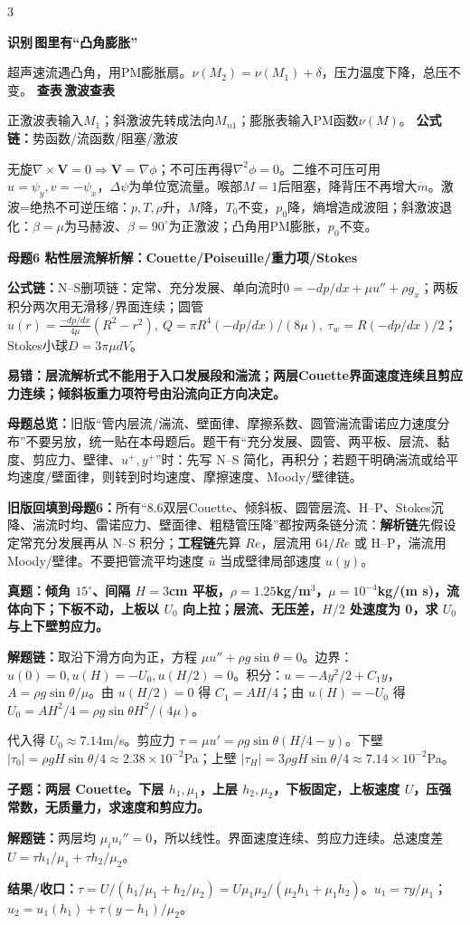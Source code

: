 \documentclass[a4paper]{article}
\newcommand{\mt}[1]{\vspace{0.12pt}\colorbox{M}{\parbox{\dimexpr\linewidth-2\fboxsep}{\color{white}\bfseries #1}}\par}
\newcommand{\qt}[1]{\vspace{0.04pt}\colorbox{Q}{\parbox{\dimexpr\linewidth-2\fboxsep}{\color{white}\bfseries #1}}\par}
\newcommand{\ans}[1]{\colorbox{G}{\parbox{\dimexpr\linewidth-2\fboxsep}{#1}}\par}
\newcommand{\warn}[1]{\colorbox{Y}{\parbox{\dimexpr\linewidth-2\fboxsep}{\color{E}\bfseries #1}}\par}
\newcommand{\chain}[1]{{\color{A}\bfseries 解题链：}#1\par}
\newcommand{\res}[1]{{\color{E}\bfseries 结果/收口：}#1\par}
\newcommand{\form}[1]{{\color{M}\bfseries 公式链：}#1\par}
\newcommand{\labtag}[3]{{\bfseries\color{#1}\colorbox{#1}{\color{white}\fontsize{2.18}{2.28}\selectfont #2}\,#3}\par}
\newcommand{\iden}[1]{\labtag{C}{识别}{#1}}
\newcommand{\lookup}[1]{\labtag{C}{查表}{#1}}
\newcommand{\mview}[1]{\ans{\textbf{母题总览：}#1}}
\newcommand{\idq}[1]{\iden{#1}}
\newcommand{\formq}[1]{\form{#1}}
\newcommand{\lookq}[1]{\lookup{#1}}
\newenvironment{vfourWrap}{\par\begingroup\fontsize{2.56}{2.70}\selectfont\setlength{\fboxsep}{0.38pt}}{\par\endgroup}
\begin{document}
\begin{multicols}{3}
\begin{vfourWrap}
\idq{图里有“凸角膨胀”}
超声速流遇凸角，用PM膨胀扇。$\nu(M_2)=\nu(M_1)+\delta$，压力温度下降，总压不变。
\lookq{激波查表}
正激波表输入$M_1$；斜激波先转成法向$M_{n1}$；膨胀表输入PM函数$\nu(M)$。
\formq{势函数/流函数/阻塞/激波}
无旋$\nabla\times\bm V=0\Rightarrow\bm V=\nabla\phi$；不可压再得$\nabla^2\phi=0$。二维不可压可用$u=\psi_y,v=-\psi_x$，$\Delta\psi$为单位宽流量。喉部$M=1$后阻塞，降背压不再增大$\dot m$。激波=绝热不可逆压缩：$p,T,\rho$升，$M$降，$T_0$不变，$p_0$降，熵增造成波阻；斜激波退化：$\beta=\mu$为马赫波、$\beta=90^\circ$为正激波；凸角用PM膨胀，$p_0$不变。
\end{vfourWrap}
\mt{母题6 粘性层流解析解：Couette/Poiseuille/重力项/Stokes}
\form{N--S删项链：定常、充分发展、单向流时$0=-dp/dx+\mu u''+\rho g_x$；两板积分两次用无滑移/界面连续；圆管$u(r)=\frac{-dp/dx}{4\mu}(R^2-r^2),\ Q=\pi R^4(-dp/dx)/(8\mu),\ \tau_w=R(-dp/dx)/2$；Stokes小球$D=3\pi\mu dV$。}
\warn{易错：层流解析式不能用于入口发展段和湍流；两层Couette界面速度连续且剪应力连续；倾斜板重力项符号由沿流向正方向决定。}
\mview{旧版“管内层流/湍流、壁面律、摩擦系数、圆管湍流雷诺应力速度分布”不要另放，统一贴在本母题后。题干有“充分发展、圆管、两平板、层流、黏度、剪应力、壁律、$u^+,y^+$”时：先写 N--S 简化，再积分；若题干明确湍流或给平均速度/壁面律，则转到时均速度、摩擦速度、Moody/壁律链。}
\ans{\textbf{旧版回填到母题6：}所有“8.6双层Couette、倾斜板、圆管层流、H--P、Stokes沉降、湍流时均、雷诺应力、壁面律、粗糙管压降”都按两条链分流：\textbf{解析链}先假设定常充分发展再从 N--S 积分；\textbf{工程链}先算 $Re$，层流用 $64/Re$ 或 H--P，湍流用 Moody/壁律。不要把管流平均速度 $\bar u$ 当成壁律局部速度 $u(y)$。}
\qt{真题：倾角 $15^\circ$、间隔 $H=3$cm 平板，$\rho=1.25$kg/m$^3$，$\mu=10^{-4}$kg/(m s)，流体向下；下板不动，上板以 $U_0$ 向上拉；层流、无压差，$H/2$ 处速度为 0，求 $U_0$ 与上下壁剪应力。}
\chain{取沿下滑方向为正，方程 $\mu u''+\rho g\sin\theta=0$。边界：$u(0)=0,u(H)=-U_0,u(H/2)=0$。积分：$u=-Ay^2/2+C_1y$，$A=\rho g\sin\theta/\mu$。由 $u(H/2)=0$ 得 $C_1=AH/4$；由 $u(H)=-U_0$ 得 $U_0=AH^2/4=\rho g\sin\theta H^2/(4\mu)$。}
\ans{代入得 $U_0\approx7.14$m/s。剪应力 $\tau=\mu u'=\rho g\sin\theta(H/4-y)$。下壁 $|\tau_0|=\rho gH\sin\theta/4\approx2.38\times10^{-2}$Pa；上壁 $|\tau_H|=3\rho gH\sin\theta/4\approx7.14\times10^{-2}$Pa。}

\qt{子题：两层 Couette。下层 $h_1,\mu_1$，上层 $h_2,\mu_2$，下板固定，上板速度 $U$，压强常数，无质量力，求速度和剪应力。}
\chain{两层均 $\mu_i u_i''=0$，所以线性。界面速度连续、剪应力连续。总速度差 $U=\tau h_1/\mu_1+\tau h_2/\mu_2$。}
\res{$\tau=U/(h_1/\mu_1+h_2/\mu_2)=U\mu_1\mu_2/(\mu_2h_1+\mu_1h_2)$。$u_1=\tau y/\mu_1$；$u_2=u_1(h_1)+\tau(y-h_1)/\mu_2$。}


\end{multicols}
\end{document}
